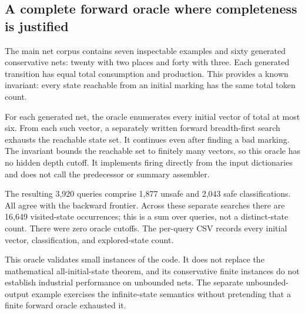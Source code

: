 \documentclass[11pt,a4paper]{article}
\theoremstyle{definition}
\theoremstyle{remark}
\begin{document}
\subsection{A complete forward oracle where completeness is justified}
The main net corpus contains seven inspectable examples and sixty generated conservative nets: twenty with two places and forty with three. Each generated transition has equal total consumption and production. This provides a known invariant: every state reachable from an initial marking has the same total token count.

For each generated net, the oracle enumerates every initial vector of total at most six. From each such vector, a separately written forward breadth-first search exhausts the reachable state set. It continues even after finding a bad marking. The invariant bounds the reachable set to finitely many vectors, so this oracle has no hidden depth cutoff. It implements firing directly from the input dictionaries and does not call the predecessor or summary assembler.

The resulting 3,920 queries comprise 1,877 unsafe and 2,043 safe classifications. All agree with the backward frontier. Across these separate searches there are 16,649 visited-state occurrences; this is a sum over queries, not a distinct-state count. There were zero oracle cutoffs. The per-query CSV records every initial vector, classification, and explored-state count.

This oracle validates small instances of the code. It does not replace the mathematical all-initial-state theorem, and its conservative finite instances do not establish industrial performance on unbounded nets. The separate unbounded-output example exercises the infinite-state semantics without pretending that a finite forward oracle exhausted it.
\end{document}
